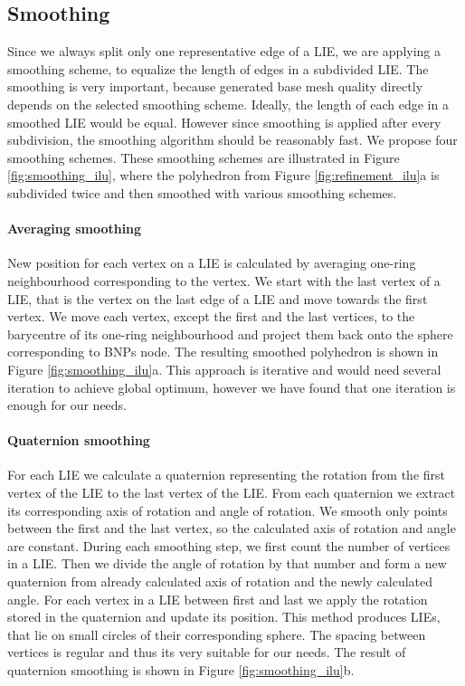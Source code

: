 \subsection{Smoothing}
Since we always split only one representative edge of a LIE, we are applying a smoothing scheme, to equalize the length of edges in a subdivided LIE. The smoothing is very important, because generated base mesh quality directly depends on the selected smoothing scheme. Ideally, the length of each edge in a smoothed LIE would be equal. However since smoothing is applied after every subdivision, the smoothing algorithm should be reasonably fast. We propose four smoothing schemes. These smoothing schemes are illustrated in Figure \ref{fig:smoothing_ilu}, where the polyhedron from Figure \ref{fig:refinement_ilu}a is subdivided twice and then smoothed with various smoothing schemes.

\paragraph{Averaging smoothing}
New position for each vertex on a LIE is calculated by averaging one-ring neighbourhood corresponding to the vertex. We start with the last vertex of a LIE, that is the vertex on the last edge of a LIE and move towards the first vertex. We move each vertex, except the first and the last vertices, to the barycentre of its one-ring neighbourhood and project them back onto the sphere corresponding to BNPs node. The resulting smoothed polyhedron is shown in Figure \ref{fig:smoothing_ilu}a. This approach is iterative and would need several iteration to achieve global optimum, however we have found that one iteration is enough for our needs.

\paragraph{Quaternion smoothing}
For each LIE we calculate a quaternion representing the rotation from the first vertex of the LIE to the last vertex of the LIE. From each quaternion we extract its corresponding axis of rotation and angle of rotation. We smooth only points between the first and the last vertex, so the calculated axis of rotation and angle are constant. During each smoothing step, we first count the number of vertices in a LIE. Then we divide the angle of rotation by that number and form a new quaternion from already calculated axis of rotation and the newly calculated angle. For each vertex in a LIE between first and last we apply the rotation stored in the quaternion and update its position. This method produces LIEs, that lie on small circles of their corresponding sphere. The spacing between vertices is regular and thus its very suitable for our needs. The result of quaternion smoothing is shown in Figure \ref{fig:smoothing_ilu}b.

